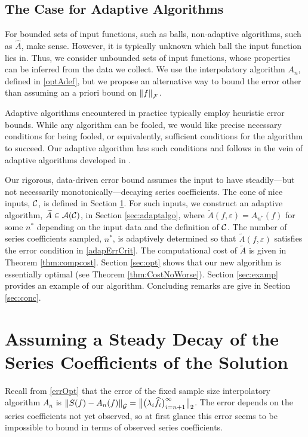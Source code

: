 \documentclass[graybox,footinfo]{svmult}
\newcommand{\DHJRnorm}[2][{}]{\ensuremath{\left \lVert #2 \right \rVert}_{#1}}
\newcommand{\DHJRbignorm}[2][{}]{\ensuremath{\bigl \lVert #2 \bigr \rVert}_{#1}}
\begin{document}
\subsection{The Case for Adaptive Algorithms}
For bounded sets of input functions, such as balls, non-adaptive algorithms, such as $\widehat{A}$, make sense.  However, it is typically unknown which ball the input function lies in.  Thus, we consider unbounded sets of input functions, whose properties can be inferred from the data we collect.  We use the interpolatory algorithm $A_n$, defined in \eqref{optAdef}, but we propose an alternative way to bound the error other than assuming an a priori bound on $\DHJRnorm[\calF]{f}$.

Adaptive algorithms encountered in practice typically employ heuristic error bounds.  While any algorithm can be fooled, we would like precise necessary conditions for being fooled, or equivalently, sufficient conditions for the algorithm to succeed.  Our adaptive algorithm has such conditions and follows in the vein of adaptive algorithms developed in \cite{HicEtal14a, HIcEtal14b, HicJim16a, JimHic16a}.

Our rigorous, data-driven error bound assumes the input to have steadily---but not necessarily monotonically---decaying series coefficients.  The cone of nice inputs, ${\mathcal{C}}$, is defined in Section \ref{sec:cone}.  For such inputs, we construct an adaptive algorithm, $\widetilde{A} \in {\mathcal{A}}({\mathcal{C}})$, in Section \ref{sec:adaptalgo},  where $\widetilde{A}(f,\varepsilon) = A_{n^*}(f)$ for some $n^*$ depending on the input data and the definition of ${\mathcal{C}}$.  The number of series coefficients sampled, $n^*$, is adaptively determined so that $\widetilde{A}(f,\varepsilon)$ satisfies the error condition in \eqref{adapErrCrit}.  The computational cost of $\widetilde{A}$ is given in  Theorem \ref{thm:compcost}.  Section \ref{sec:opt} shows that our new algorithm is essentially optimal (see Theorem \ref{thm:CostNoWorse}).  Section \ref{sec:examp} provides an example of our algorithm.  Concluding remarks are give in Section \ref{sec:conc}. 




\section{Assuming a Steady Decay of the Series Coefficients of the Solution} \label{sec:cone}

Recall from \eqref{errOpt} that the error of the fixed sample size interpolatory algorithm $A_n$ is $\DHJRnorm[\calG]{S(f) - A_n(f)} = \DHJRbignorm[2]{\bigl(\lambda_{i} \widehat{f}_{i} \bigr)_{i= n+1}^{\infty}}$.  The error depends on the series coefficients not yet observed, so at first glance this error seems to be impossible to bound in terms of observed series coefficients.  
\end{document}
